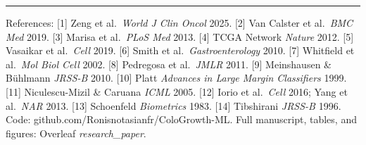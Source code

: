 \documentclass[10pt]{article}
\begin{document}
\vspace{0.15cm}
\hrule
\vspace{0.1cm}
{\scriptsize
References: [1] Zeng et al.\ \emph{World J Clin Oncol} 2025. [2] Van Calster et al.\ \emph{BMC Med} 2019. [3] Marisa et al.\ \emph{PLoS Med} 2013. [4] TCGA Network \emph{Nature} 2012. [5] Vasaikar et al.\ \emph{Cell} 2019. [6] Smith et al.\ \emph{Gastroenterology} 2010. [7] Whitfield et al.\ \emph{Mol Biol Cell} 2002. [8] Pedregosa et al.\ \emph{JMLR} 2011. [9] Meinshausen \& B\"uhlmann \emph{JRSS-B} 2010. [10] Platt \emph{Advances in Large Margin Classifiers} 1999. [11] Niculescu-Mizil \& Caruana \emph{ICML} 2005. [12] Iorio et al.\ \emph{Cell} 2016; Yang et al.\ \emph{NAR} 2013. [13] Schoenfeld \emph{Biometrics} 1983. [14] Tibshirani \emph{JRSS-B} 1996. Code: github.com/Ronisnotasianfr/ColoGrowth-ML. Full manuscript, tables, and figures: Overleaf \emph{research\_paper}.}
\end{document}

